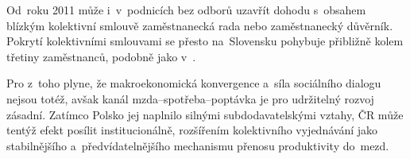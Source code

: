 Od~roku 2011 může i~v~podnicích bez odborů uzavřít dohodu s~obsahem blízkým kolektivní smlouvě zaměstnanecká rada nebo zaměstnanecký důvěrník. Pokrytí kolektivními smlouvami se přesto na~Slovensku pohybuje přibližně kolem třetiny zaměstnanců, podobně jako v~.~\cite{Hala_SystemySocialnihoDialogu2013}\par

Pro  z~toho plyne, že makroekonomická konvergence a~síla sociálního dialogu nejsou totéž, avšak kanál mzda--spotřeba--poptávka je pro udržitelný rozvoj zásadní. Zatímco Polsko jej naplnilo silnými subdodavatelskými vztahy, \ac{ČR} může tentýž efekt posílit institucionálně, rozšířením kolektivního vyjednávání jako stabilnějšího a~předvídatelnějšího mechanismu přenosu produktivity do~mezd.\par
